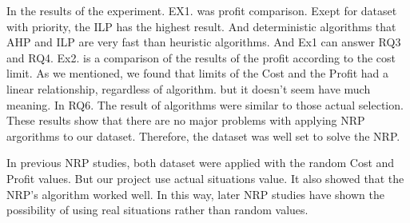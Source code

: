 In the results of the experiment.
EX1. was profit comparison. Exept for dataset with priority, the ILP has the highest result. And deterministic algorithms that AHP and ILP are very fast than heuristic algorithms. And Ex1 can answer RQ3 and RQ4. Ex2. is a comparison of the results of the profit according to the cost limit. As we mentioned, we found that limits of the Cost and the Profit had a linear relationship, regardless of algorithm. but it doesn't seem have much meaning. In RQ6. The result of algorithms were similar to those actual selection. These results show that there are no major problems with applying NRP argorithms to our dataset. Therefore, the dataset was well set to solve the NRP.

In previous NRP studies, both dataset were applied with the random Cost and Profit values. But our project use actual situations value. It also showed that the NRP's algorithm worked well. In this way, later NRP studies have shown the possibility of using real situations rather than random values. 


